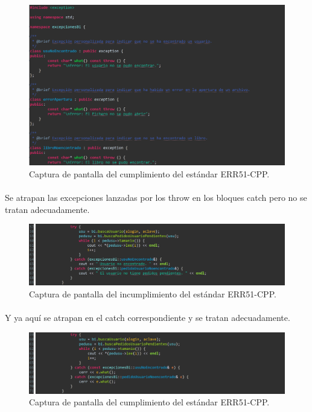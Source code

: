 			\begin{figure}[H]
				\centering
				\includegraphics[scale=0.8]{img/img11.png}
				\caption{Captura de pantalla del cumplimiento del estándar ERR51-CPP.}
				\label{img11}
			\end{figure}
			
			\paragraph{}Se atrapan las excepciones lanzadas por los throw en los bloques catch pero no se tratan adecuadamente.
			
			\begin{figure}[H]
				\centering
				\includegraphics[scale=0.8]{img/img12.png}
				\caption{Captura de pantalla del incumplimiento del estándar ERR51-CPP.}
				\label{img12}
			\end{figure}
			
			\paragraph{}Y ya aquí se atrapan en el catch correspondiente y se tratan adecuadamente.
			
			\begin{figure}[H]
				\centering
				\includegraphics[scale=0.8]{img/img13.png}
				\caption{Captura de pantalla del cumplimiento del estándar ERR51-CPP.}
				\label{img13}
			\end{figure}
	
